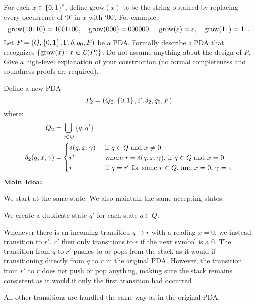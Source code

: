 \begin{problem}
  For each $x \in \left\{0, 1\right\}^*$, define $\text{grow}(x)$ to be the string
  obtained by replacing every occurrence of `$0$' in $x$ with `$00$'.
  For example:
  \[ 
          \text{grow}(10110) = 1001100,
    \quad \text{grow}(000) = 000000,
    \quad \text{grow}(\varepsilon) = \varepsilon,
    \quad \text{grow}(11) = 11.
  \]
  Let $P = (Q, \left\{0, 1\right\}, \Gamma, \delta, q_0, F)$ be a PDA.
  Formally describe a PDA that recognizes $\left\{\text{grow}(x) : x \in \mathcal{L}(P)\right\}$.
  Do not assume anything about the design of $P$. \\
  Give a high-level explanation of your construction
  (no formal completeness and soundness proofs are required).
\end{problem}
\begin{Answer}
  Define a new PDA
  \[ P_2 = (Q_2, \left\{0, 1\right\}, \Gamma, \delta_2, q_0, F) \]
  where:
  \begin{align*}
    Q_2 &= \bigcup_{q \in Q} \left\{q, q'\right\} \\
    \delta_2(q, x, \gamma) &= \begin{cases}
      \delta(q, x, \gamma) &\text{ if $q \in Q$ and $x \ne 0$} \\
      r' &\text{ where $r = \delta(q, x, \gamma)$, if $q \in Q$ and $x = 0$} \\
      r &\text{ if $q = r'$ for some $r \in Q$, and $x = 0$, $\gamma = \varepsilon$}
    \end{cases}
  \end{align*}
  \textbf{Main Idea:}
  \begin{enumroman}
    \item We start at the same state. We also maintain the same accepting states.
    \item We create a duplicate state $q'$ for each state $q \in Q$.
    \item Whenever there is an incoming transition $q \to r$ with a reading $x = 0$,
      we instead transition to $r'$. $r'$ then only transitions to $r$ if the next
      symbol is a $0$.
      The transition from $q$ to $r'$ pushes to or pops from the stack as
      it would if transitioning directly from $q$ to $r$ in the original PDA.
      However, the transition from $r'$ to $r$ does not push or pop anything,
      making sure the stack remains consistent as it would if only the first
      transition had occurred.
    \item All other transitions are handled the same way as in the original PDA.
  \end{enumroman}

\end{Answer}
